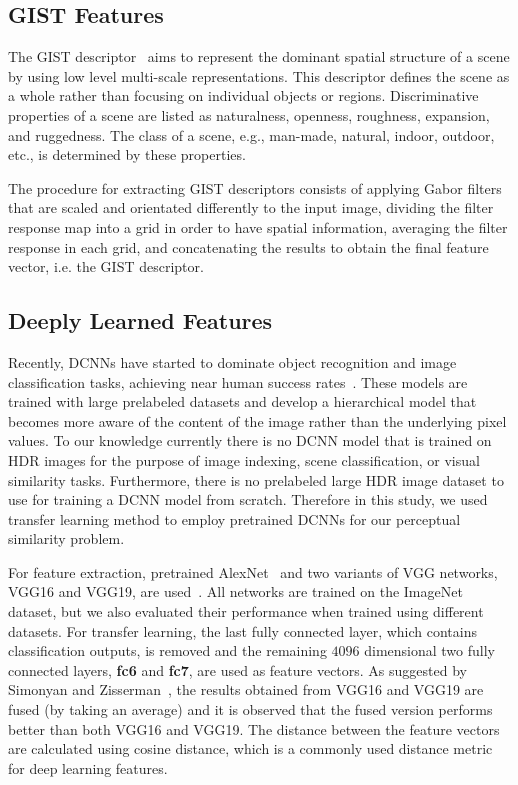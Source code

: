 \subsection{GIST Features}
The GIST descriptor~\cite{oliva2001modeling} aims to represent the dominant spatial structure of a scene by using low level multi-scale representations. This descriptor defines the scene as a whole rather than focusing on individual objects or regions. Discriminative properties of a scene are listed as naturalness, openness, roughness, expansion, and ruggedness. The class of a scene, e.g., man-made, natural, indoor, outdoor, etc., is determined by these properties.

The procedure for extracting GIST descriptors consists of applying Gabor filters that are scaled and orientated differently to the input image, dividing the filter response map into a grid in order to have spatial information, averaging the filter response in each grid, and concatenating the results to obtain the final feature vector, i.e. the GIST descriptor.

\subsection{Deeply Learned Features}
Recently, DCNNs have started to dominate object recognition and image classification tasks, achieving near human success rates~\cite{krizhevsky2012imagenet,simon14,zhou2017scene}. These models are trained with large prelabeled datasets and develop a hierarchical model that becomes more aware of the content of the image rather than the underlying pixel values. To our knowledge currently there is no DCNN model that is trained on HDR images for the purpose of image indexing, scene classification, or visual similarity tasks.
Furthermore, there is no prelabeled large HDR image dataset to use for training a DCNN model from scratch. Therefore in this study, we used transfer learning method to employ pretrained DCNNs for our perceptual
similarity problem. 

For feature extraction, pretrained AlexNet~\cite{krizhevsky2012imagenet} and two variants of VGG networks, VGG16 and VGG19, are used~\cite{simon14}. All networks are trained on the ImageNet~\cite{russakovsky2015imagenet} dataset, but we also evaluated their performance when trained using
different datasets. For transfer learning, the last fully connected layer, which contains classification outputs, is removed and the remaining $4096$ dimensional two fully connected layers, \textbf{fc6} and \textbf{fc7}, are used as feature vectors. As suggested by Simonyan and Zisserman~\cite{simonyan2014very}, the results obtained from VGG16 and VGG19 are fused (by taking an average) and it is observed that
the fused version performs better than both VGG16 and VGG19. The distance between the feature vectors are calculated using cosine distance, which is a commonly used distance metric for deep learning features. 
